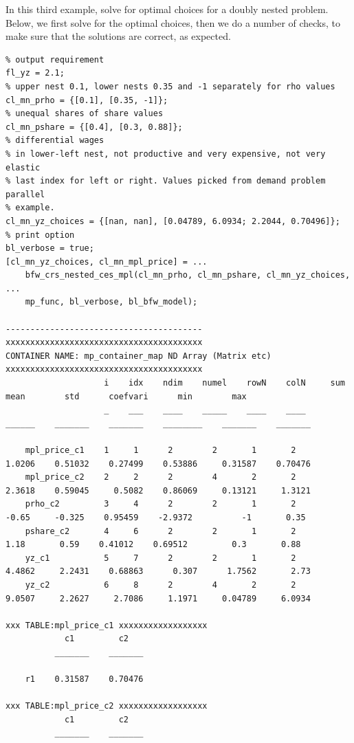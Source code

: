 \documentclass[
]{book}
\begin{document}
In this third example, solve for optimal choices for a doubly nested
problem. Below, we first solve for the optimal choices, then we do a
number of checks, to make sure that the solutions are correct, as
expected.

\begin{verbatim}
% output requirement
fl_yz = 2.1;
% upper nest 0.1, lower nests 0.35 and -1 separately for rho values
cl_mn_prho = {[0.1], [0.35, -1]};
% unequal shares of share values
cl_mn_pshare = {[0.4], [0.3, 0.88]};
% differential wages
% in lower-left nest, not productive and very expensive, not very elastic
% last index for left or right. Values picked from demand problem parallel
% example.
cl_mn_yz_choices = {[nan, nan], [0.04789, 6.0934; 2.2044, 0.70496]};
% print option
bl_verbose = true;
[cl_mn_yz_choices, cl_mn_mpl_price] = ...
    bfw_crs_nested_ces_mpl(cl_mn_prho, cl_mn_pshare, cl_mn_yz_choices, ...
    mp_func, bl_verbose, bl_bfw_model);

----------------------------------------
xxxxxxxxxxxxxxxxxxxxxxxxxxxxxxxxxxxxxxxx
CONTAINER NAME: mp_container_map ND Array (Matrix etc)
xxxxxxxxxxxxxxxxxxxxxxxxxxxxxxxxxxxxxxxx
                    i    idx    ndim    numel    rowN    colN     sum       mean        std      coefvari      min        max  
                    _    ___    ____    _____    ____    ____    ______    _______    _______    ________    _______    _______

    mpl_price_c1    1     1      2        2       1       2      1.0206    0.51032    0.27499    0.53886     0.31587    0.70476
    mpl_price_c2    2     2      2        4       2       2      2.3618    0.59045     0.5082    0.86069     0.13121     1.3121
    prho_c2         3     4      2        2       1       2       -0.65     -0.325    0.95459    -2.9372          -1       0.35
    pshare_c2       4     6      2        2       1       2        1.18       0.59    0.41012    0.69512         0.3       0.88
    yz_c1           5     7      2        2       1       2      4.4862     2.2431    0.68863      0.307      1.7562       2.73
    yz_c2           6     8      2        4       2       2      9.0507     2.2627     2.7086     1.1971     0.04789     6.0934

xxx TABLE:mpl_price_c1 xxxxxxxxxxxxxxxxxx
            c1         c2   
          _______    _______

    r1    0.31587    0.70476

xxx TABLE:mpl_price_c2 xxxxxxxxxxxxxxxxxx
            c1         c2   
          _______    _______


\end{verbatim}
\end{document}

